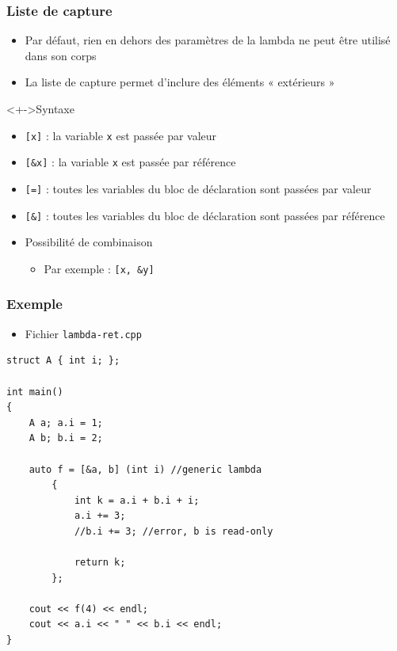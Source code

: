 \begin{frame}
\frametitle{Liste de capture}
\begin{itemize}[<+->]
\item Par défaut, rien en dehors des paramètres de la lambda ne peut être utilisé dans son corps
\item La liste de capture permet d'inclure des éléments « extérieurs »
\end{itemize}
\begin{exampleblock}<+->{Syntaxe}
	\begin{itemize}[<+->]
	\item \lstinline|[x]| : la variable \texttt{x} est passée par valeur
	\item \lstinline|[&x]| : la variable \texttt{x} est passée par référence
	\item \lstinline|[=]| : toutes les variables du bloc de déclaration sont passées par valeur
	\item \lstinline|[&]| : toutes les variables du bloc de déclaration sont passées par référence
	\end{itemize}
\end{exampleblock}
\begin{itemize}[<+->]
\item Possibilité de combinaison
	\begin{itemize}
	\item Par exemple : \lstinline|[x, &y]|
	\end{itemize}
\end{itemize}
\end{frame}

\begin{frame}[containsverbatim]
\frametitle{Exemple}
\begin{itemize}
\item Fichier \texttt{lambda-ret.cpp}
\end{itemize}
\begin{lstlisting}
struct A { int i; };

int main()
{
	A a; a.i = 1; 
	A b; b.i = 2;
	
	auto f = [&a, b] (int i) //generic lambda
		{
			int k = a.i + b.i + i;
			a.i += 3;
			//b.i += 3; //error, b is read-only

			return k;
		};

	cout << f(4) << endl;
	cout << a.i << " " << b.i << endl;
}
\end{lstlisting}
\end{frame}

